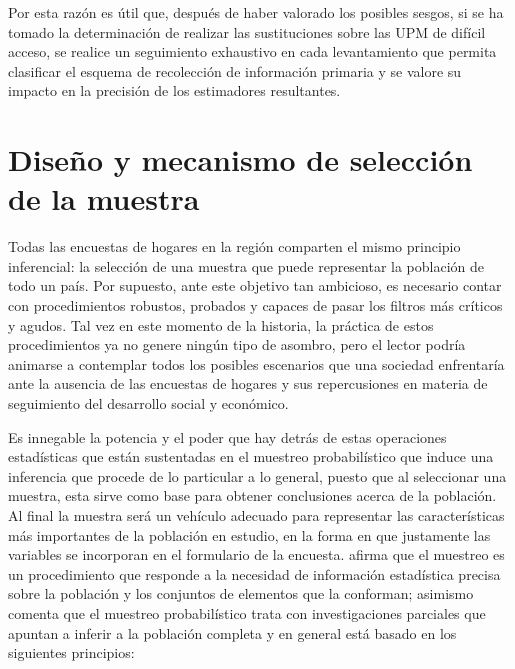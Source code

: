 \documentclass[
  12pt,
]{book}
\begin{document}
Por esta razón es útil que, después de haber valorado los posibles sesgos, si se ha tomado la determinación de realizar las sustituciones sobre las UPM de difícil acceso, se realice un seguimiento exhaustivo en cada levantamiento que permita clasificar el esquema de recolección de información primaria y se valore su impacto en la precisión de los estimadores resultantes.

\hypertarget{diseuxf1o-y-mecanismo-de-selecciuxf3n-de-la-muestra}{%
\chapter{Diseño y mecanismo de selección de la muestra}\label{diseuxf1o-y-mecanismo-de-selecciuxf3n-de-la-muestra}}

Todas las encuestas de hogares en la región comparten el mismo principio inferencial: la selección de una muestra que puede representar la población de todo un país. Por supuesto, ante este objetivo tan ambicioso, es necesario contar con procedimientos robustos, probados y capaces de pasar los filtros más críticos y agudos. Tal vez en este momento de la historia, la práctica de estos procedimientos ya no genere ningún tipo de asombro, pero el lector podría animarse a contemplar todos los posibles escenarios que una sociedad enfrentaría ante la ausencia de las encuestas de hogares y sus repercusiones en materia de seguimiento del desarrollo social y económico.

Es innegable la potencia y el poder que hay detrás de estas operaciones estadísticas que están sustentadas en el muestreo probabilístico que induce una inferencia que procede de lo particular a lo general, puesto que al seleccionar una muestra, esta sirve como base para obtener conclusiones acerca de la población. Al final la muestra será un vehículo adecuado para representar las características más importantes de la población en estudio, en la forma en que justamente las variables se incorporan en el formulario de la encuesta. \citet{Gutierrez_2016} afirma que el muestreo es un procedimiento que responde a la necesidad de información estadística precisa sobre la población y los conjuntos de elementos que la conforman; asimismo comenta que el muestreo probabilístico trata con investigaciones parciales que apuntan a inferir a la población completa y en general está basado en los siguientes principios:
\end{document}
